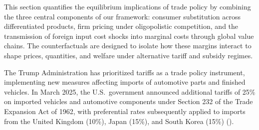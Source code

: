 \documentclass[11pt]{article}
\begin{document}

This section quantifies the equilibrium implications of trade policy by combining the three central components of our framework: consumer substitution across differentiated products, firm pricing under oligopolistic competition, and the transmission of foreign input cost shocks into marginal costs through global value chains. The counterfactuals are designed to isolate how these margins interact to shape prices, quantities, and welfare under alternative tariff and subsidy regimes.

The Trump Administration has prioritized tariffs as a trade policy instrument, implementing new measures affecting imports of automotive parts and finished vehicles. In March 2025, the U.S.\ government announced additional tariffs of 25\% on imported vehicles and automotive components under Section 232 of the Trade Expansion Act of 1962, with preferential rates subsequently applied to imports from the United Kingdom (10\%), Japan (15\%), and South Korea (15\%) (\cite{united_states_congress_section_2025}).
\end{document}
